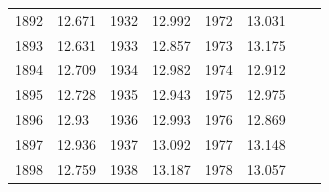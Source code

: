 \begin{description}[noitemsep]
\begin{description}[noitemsep]
\begin{table}
\begin{center}
\begin{xtabular}[t]{|l|l|l|l|l|l|l|l|}
     \tabularnewline{}
        	1892	 &
        	12.671	 &
        	1932	 &
        	12.992	 &
        	1972	 &
        	13.031	 &
        		 &
     \tabularnewline{}
        	1893	 &
        	12.631	 &
        	1933	 &
        	12.857	 &
        	1973	 &
        	13.175	 &
        		 &
     \tabularnewline{}
        	1894	 &
        	12.709	 &
        	1934	 &
        	12.982	 &
        	1974	 &
        	12.912	 &
        		 &
     \tabularnewline{}
        	1895	 &
        	12.728	 &
        	1935	 &
        	12.943	 &
        	1975	 &
        	12.975	 &
        		 &
     \tabularnewline{}
        	1896	 &
        	12.93	 &
        	1936	 &
        	12.993	 &
        	1976	 &
        	12.869	 &
        		 &
     \tabularnewline{}
        	1897	 &
        	12.936	 &
        	1937	 &
        	13.092	 &
        	1977	 &
        	13.148	 &
        		 &
     \tabularnewline{}
        	1898	 &
        	12.759	 &
        	1938	 &
        	13.187	 &
        	1978	 &
        	13.057	 &
        		 &
     \tabularnewline{}

\end{xtabular}
\end{center}
\end{table}
\end{description}
\end{description}
